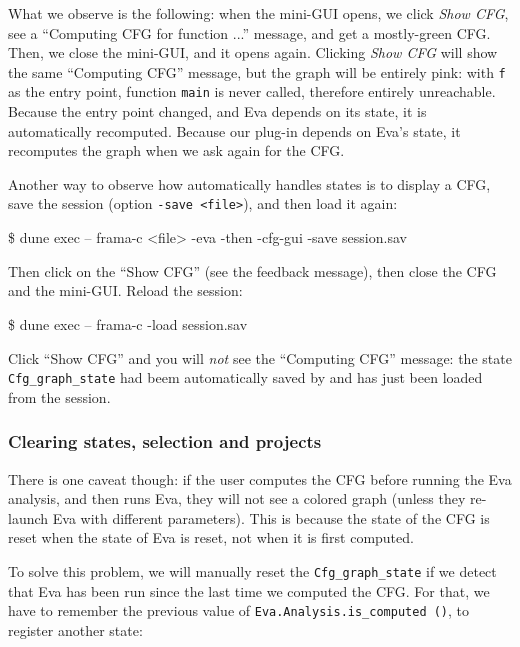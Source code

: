 What we observe is the following: when the mini-GUI opens, we click
{\em Show CFG}, see a ``Computing CFG for function ...'' message, and get a
mostly-green CFG. Then, we close the mini-GUI, and it opens again. Clicking
{\em Show CFG} will show the same ``Computing CFG'' message, but the graph will
be entirely pink: with \verb|f| as the entry point, function \verb|main| is
never called, therefore entirely unreachable. Because the entry point changed,
and \textsf{Eva} depends on its state, it is automatically recomputed.
Because our plug-in depends on \textsf{Eva}'s state, it recomputes the graph
when we ask again for the CFG.

Another way to observe how \framac automatically handles states is to display a
CFG, save the session (option \verb|-save <file>|), and then load it again:

\begin{frama-c-commands}
\$ dune exec -- frama-c <file> -eva -then -cfg-gui -save session.sav
\end{frama-c-commands}

Then click on the ``Show CFG'' (see the feedback message), then close the CFG
and the mini-GUI. Reload the session:

\begin{frama-c-commands}
\$ dune exec -- frama-c -load session.sav
\end{frama-c-commands}

Click ``Show CFG'' and you will {\em not} see the ``Computing CFG'' message:
the state \texttt{Cfg\_graph\_state} had beem automatically saved by \framac
and has just been loaded from the session.

\subsubsection{Clearing states, selection and projects}

There is one caveat though: if the user computes the CFG before
running the \textsf{Eva} analysis, and then runs \textsf{Eva}, they
will not see a colored graph (unless they re-launch \textsf{Eva}
with different parameters). This is because the state of the
CFG is reset when the state of \textsf{Eva} is reset, not when it is
first computed.

To solve this problem, we will manually reset the
\texttt{Cfg\_graph\_state} if we detect that \textsf{Eva}
has been run since the last time we computed the CFG. For
that, we have to remember the previous value of
\texttt{Eva.Analysis.is\_computed ()}, \ie to register another state:


